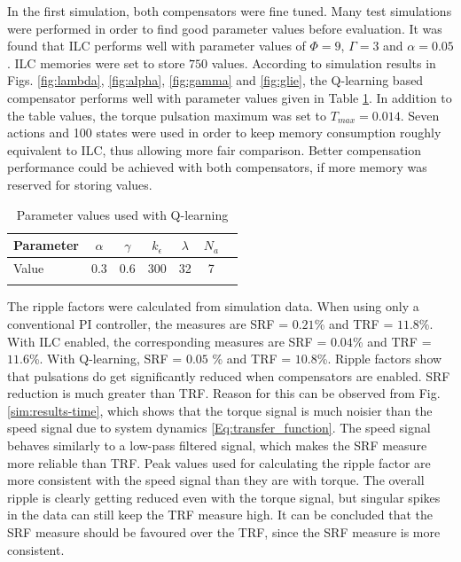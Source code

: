 In the first simulation, both compensators were fine tuned. Many test simulations were performed in order to find good parameter values before evaluation. It was found that ILC performs well with parameter values of $\Phi = 9$, $\Gamma = 3$ and $\alpha = 0.05$. ILC memories were set to store $750$ values. According to simulation results in Figs. \ref{fig:lambda}, \ref{fig:alpha}, \ref{fig:gamma} and \ref{fig:glie}, the Q-learning based compensator performs well with parameter values given in Table  \ref{Tbl:Q-params}. In addition to the table values, the torque pulsation maximum was set to $T_{max}=0.014$. Seven actions and 100 states were used in order to keep memory consumption roughly equivalent to ILC, thus allowing more fair comparison. Better compensation performance could be achieved with both compensators, if more memory was reserved for storing values.

\begin{table}[b]
\caption{Parameter values used with Q-learning}
\centering
\begin{tabular}[t]{lcccccc}
\hline
Parameter    & $\alpha$ & $\gamma$ & $k_\epsilon$ & $\lambda$ & $N_a$\\
\hline
Value    & \num{0.3} & \num{0.6} &  \num{300} & \num{32} & \num{7}\\
\hline
\label{Tbl:Q-params}
\end{tabular}%
\end{table}%

The ripple factors were calculated from simulation data. When using only a conventional PI controller, the measures are SRF = $0.21$\% and TRF = $11.8$\%. With ILC enabled, the corresponding measures are SRF = $0.04$\% and TRF = $11.6$\%. With Q-learning, SRF = $0.05$ \% and TRF = $10.8$\%. Ripple factors show that pulsations do get significantly reduced when compensators are enabled. SRF reduction is much greater than TRF. Reason for this can be observed from Fig. \ref{sim:results-time}, which shows that the torque signal is much noisier than the speed signal due to system dynamics \eqref{Eq:transfer_function}. The speed signal behaves similarly to a low-pass filtered signal, which makes the SRF measure more reliable than TRF. Peak values used for calculating the ripple factor are more consistent with the speed signal than they are with torque. The overall ripple is clearly getting reduced even with the torque signal, but singular spikes in the data can still keep the TRF measure high. It can be concluded that the SRF measure should be favoured over the TRF, since the SRF measure is more consistent.

